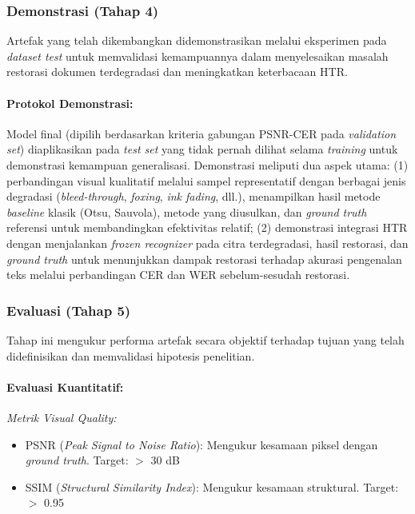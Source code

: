 \documentclass[12pt,a4paper]{article}
\begin{document}
\subsubsection{Demonstrasi (Tahap 4)}
Artefak yang telah dikembangkan didemonstrasikan melalui eksperimen pada \textit{dataset test} untuk memvalidasi kemampuannya dalam menyelesaikan masalah restorasi dokumen terdegradasi dan meningkatkan keterbacaan HTR.

\paragraph{Protokol Demonstrasi:}
Model final (dipilih berdasarkan kriteria gabungan PSNR-CER pada \textit{validation set}) diaplikasikan pada \textit{test set} yang tidak pernah dilihat selama \textit{training} untuk demonstrasi kemampuan generalisasi. Demonstrasi meliputi dua aspek utama: (1) perbandingan visual kualitatif melalui sampel representatif dengan berbagai jenis degradasi (\textit{bleed-through}, \textit{foxing}, \textit{ink fading}, dll.), menampilkan hasil metode \textit{baseline} klasik (Otsu, Sauvola), metode yang diusulkan, dan \textit{ground truth} referensi untuk membandingkan efektivitas relatif; (2) demonstrasi integrasi HTR dengan menjalankan \textit{frozen recognizer} pada citra terdegradasi, hasil restorasi, dan \textit{ground truth} untuk menunjukkan dampak restorasi terhadap akurasi pengenalan teks melalui perbandingan CER dan WER sebelum-sesudah restorasi.

\subsubsection{Evaluasi (Tahap 5)}
Tahap ini mengukur performa artefak secara objektif terhadap tujuan yang telah didefinisikan dan memvalidasi hipotesis penelitian.

\paragraph{Evaluasi Kuantitatif:}

\textit{Metrik Visual Quality:}
\begin{itemize}[leftmargin=*, nosep]
\item PSNR (\textit{Peak Signal to Noise Ratio}): Mengukur kesamaan piksel dengan \textit{ground truth}. Target: $>$ 30 dB
\item SSIM (\textit{Structural Similarity Index}): Mengukur kesamaan struktural. Target: $>$ 0.95
\end{itemize}
\end{document}
